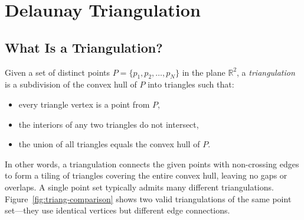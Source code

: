 \section{Delaunay Triangulation}

\subsection{What Is a Triangulation?}

Given a set of distinct points $P = \{p_1, p_2, \dots, p_N\}$ in the plane $\mathbb{R}^2$,
a \emph{triangulation} is a subdivision of the convex hull of $P$ into triangles such that:
\begin{itemize}
    \item every triangle vertex is a point from $P$,
    \item the interiors of any two triangles do not intersect,
    \item the union of all triangles equals the convex hull of $P$.
\end{itemize}

In other words, a triangulation connects the given points with non-crossing edges
to form a tiling of triangles covering the entire convex hull, leaving no gaps
or overlaps.  A single point set typically admits many different triangulations.
Figure~\ref{fig:triang-comparison} shows two valid triangulations of the same
point set---they use identical vertices but different edge connections.


